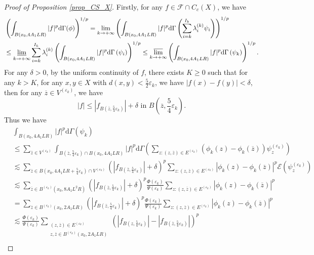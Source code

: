 \documentclass[11pt,a4paper]{article}
\numberwithin{equation}{section}
\theoremstyle{plain}
\theoremstyle{definition}
\begin{document}
\begin{proof}[Proof of Proposition \ref{prop_CS_X}]
Firstly, for any $f\in \mathcal{F}\cap C_c(X)$, we have
\begin{align*}
&\left(\int_{B(x_0,4A_1LR)}|f|^p\mathrm{d}\Gamma(\phi)\right)^{1/p}=\lim_{k\to+\infty}\left(\int_{B(x_0,4A_1LR)}|f|^p\mathrm{d}\Gamma \left(\sum_{i=k}^{I_k}\lambda^{(k)}_i\psi_i\right)\right)^{1/p}\\
&\le\varliminf_{k\to+\infty}\sum_{i=k}^{I_k}\lambda^{(k)}_i\left(\int_{B(x_0,4A_1LR)}|f|^p\mathrm{d}\Gamma \left(\psi_i\right)\right)^{1/p}\le\varlimsup_{k\to+\infty}\left(\int_{B(x_0,4A_1LR)}|f|^p\mathrm{d}\Gamma \left(\psi_k\right)\right)^{1/p}.
\end{align*}
For any $\delta>0$, by the uniform continuity of $f$, there exists $K\ge0$ such that for any $k>K$, for any $x,y\in X$ with $d(x,y)<\frac{5}{2}\varepsilon_k$, we have $|f(x)-f(y)|<\delta$, then for any $\overline{z}\in V^{(\varepsilon_k)}$, we have
\begin{equation*}
|f|\le|f_{B(\overline{z},\frac{5}{4}\varepsilon_k)}|+\delta\text{ in }B(\overline{z},\frac{5}{4}\varepsilon_k).
\end{equation*}
Thus we have
\begin{align*}
&\int_{B(x_0,4A_1LR)}|f|^p\mathrm{d}\Gamma \left(\psi_k\right)\\
&\le\sum_{\overline{z}\in V^{(\varepsilon_k)}}\int_{B(\overline{z},\frac{5}{4}\varepsilon_k)\cap B(x_0,4A_1LR)}|f|^p\mathrm{d}\Gamma \left(\sum_{z:(z,\overline{z})\in E^{(\varepsilon_k)}}(\phi_k(z)-\phi_k(\overline{z}))\psi_z^{(\varepsilon_k)}\right)\\
&\lesssim\sum_{\overline{z}\in B(x_0,4A_1LR+\frac{5}{4}\varepsilon_k)\cap V^{(\varepsilon_k)}}\left(|f_{B(\overline{z},\frac{5}{4}\varepsilon_k)}|+\delta\right)^p\sum_{z:(z,\overline{z})\in E^{(\varepsilon_k)}}|\phi_k(z)-\phi_k(\overline{z})|^p\mathcal{E} \left(\psi_z^{(\varepsilon_k)}\right)\\
&\lesssim\sum_{\overline{z}\in B^{(\varepsilon_k)}(x_0,8A_1L^2R)}\left(|f_{B(\overline{z},\frac{5}{4}\varepsilon_k)}|+\delta\right)^p\frac{\Phi(\varepsilon_k)}{\Psi(\varepsilon_k)}\sum_{z:(z,\overline{z})\in E^{(\varepsilon_k)}}|\phi_k(z)-\phi_k(\overline{z})|^p\\
&=\sum_{\overline{z}\in B^{(\varepsilon_k)}(x_0,2A_1LR)}\left(|f_{B(\overline{z},\frac{5}{4}\varepsilon_k)}|+\delta\right)^p\frac{\Phi(\varepsilon_k)}{\Psi(\varepsilon_k)}\sum_{z:(z,\overline{z})\in E^{(\varepsilon_k)}}|\phi_k(z)-\phi_k(\overline{z})|^p\\
&\lesssim\frac{\Phi(\varepsilon_k)}{\Psi(\varepsilon_k)}\sum_{\substack{(z,\overline{z})\in E^{(\varepsilon_k)}\\z,\overline{z}\in B^{(\varepsilon_k)}(x_0,2A_1LR)}}\left(|f_{B(z,\frac{5}{4}\varepsilon_k)}|-|f_{B(\overline{z},\frac{5}{4}\varepsilon_k)}|\right)^p\\

\end{align*}
\end{proof}
\end{document}
